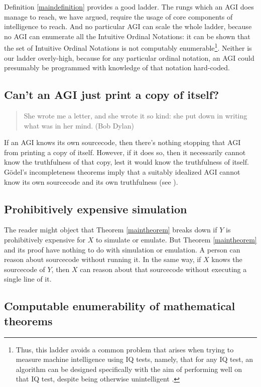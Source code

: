 \documentclass[runningheads]{llncs}
\begin{document}
Definition \ref{maindefinition} provides a good ladder.
The rungs which an AGI does
manage to reach, we have argued, require the usage of core components of intelligence
to reach.
And no particular AGI can scale
the whole ladder,
because no AGI can enumerate all the Intuitive Ordinal Notations: it can
be shown
that the set of Intuitive Ordinal Notations is not computably enumerable\footnote{Thus,
this ladder avoids a common problem that arises when
trying to measure machine intelligence using IQ tests, namely, that for any IQ test,
an algorithm can be designed specifically with the aim of performing well on that
IQ test, despite being otherwise unintelligent \cite{besold2015can}.}.
Neither is our ladder overly-high, because for any particular
ordinal notation, an AGI could presumably be programmed with knowledge of that notation
hard-coded.

\subsection{Can't an AGI just print a copy of itself?}

\begin{quote}
    She wrote me a letter, and she wrote it so kind:
    she put down in writing what was in her mind.
    (Bob Dylan)
\end{quote}

If an AGI knows its own sourcecode, then there's nothing stopping that
AGI from printing a copy of itself.
However, if it does so, then it necessarily cannot know the truthfulness of that
copy, lest it would know the truthfulness of itself.
G\"odel's incompleteness theorems imply that a suitably idealized AGI cannot know
its own sourcecode
and its own truthfulness (see \cite{alexander2014machine}).

\subsection{Prohibitively expensive simulation}

The reader might object that Theorem \ref{maintheorem} breaks down if $Y$ is prohibitively
expensive for $X$ to simulate or emulate. But Theorem \ref{maintheorem} and its
proof have nothing to do with simulation or emulation. A person can reason about sourcecode
without running it. In the same way, if $X$ knows the sourcecode
of $Y$, then $X$ can reason about that sourcecode without executing a single line
of it.

\subsection{Computable enumerability of mathematical theorems}
\end{document}
